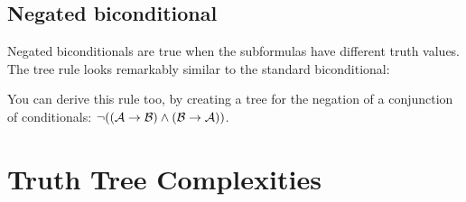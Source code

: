 \documentclass[PHIL101-Textbook.tex]{subfiles}
\begin{document}

\subsection{Negated biconditional}
Negated biconditionals are true when the subformulas have different truth values. The tree rule looks remarkably similar to the standard biconditional:


You can derive this rule too, by creating a tree for the negation of a conjunction of conditionals:  $\neg((\mathcal{A}\rightarrow\mathcal{B}) \land (\mathcal{B}\rightarrow\mathcal{A}))$.









\section{Truth Tree Complexities}
\end{document}
